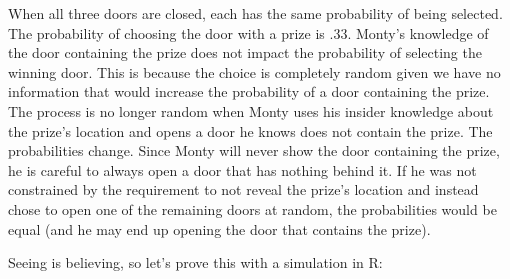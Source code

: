 \documentclass[]{book}
\begin{document}
When all three doors are closed, each has the same probability of being selected. The probability of choosing the door with a prize is .33. Monty's knowledge of the door containing the prize does not impact the probability of selecting the winning door. This is because the choice is completely random given we have no information that would increase the probability of a door containing the prize. The process is no longer random when Monty uses his insider knowledge about the prize's location and opens a door he knows does not contain the prize. The probabilities change. Since Monty will never show the door containing the prize, he is careful to always open a door that has nothing behind it. If he was not constrained by the requirement to not reveal the prize's location and instead chose to open one of the remaining doors at random, the probabilities would be equal (and he may end up opening the door that contains the prize).

Seeing is believing, so let's prove this with a simulation in R:
\end{document}
